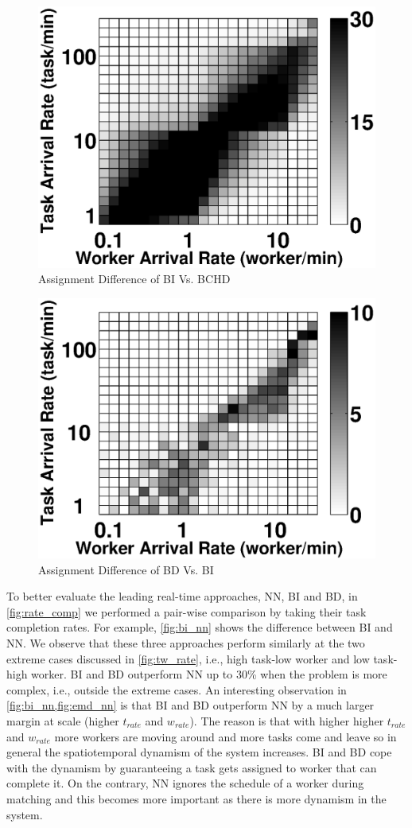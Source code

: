 \begin{figure}[h]
	\centering
	\includegraphics[width = 0.65\columnwidth]{figures/bi_bchd.eps}
	\vspace{-0.1in}
	\caption{Assignment Difference of BI Vs. BCHD}\label{fig:bi_bchd}
\end{figure}

\begin{figure}[h]
	\centering
	\includegraphics[width = 0.65\columnwidth]{figures/emd_bi.eps}
	\vspace{-0.1in}
	\caption{Assignment Difference of BD Vs. BI}\label{fig:emd_bi}
\end{figure}

To better evaluate the leading real-time approaches, NN, BI and BD, in \cref{fig:rate_comp} we performed a pair-wise comparison by taking their task completion rates. For example, \cref{fig:bi_nn} shows the difference between BI and NN. We observe that these three approaches perform similarly at the two extreme cases discussed in \cref{fig:tw_rate}, i.e., high task-low worker and low task-high worker. BI and BD outperform NN up to 30\% when the problem is more complex, i.e., outside the extreme cases. An interesting observation in \cref{fig:bi_nn,fig:emd_nn} is that BI and BD outperform NN by a much larger margin at scale (higher $t_{rate}$ and $w_{rate}$). The reason is that with higher higher $t_{rate}$ and $w_{rate}$ more workers are moving around and more tasks come and leave so in general the spatiotemporal dynamism of the system increases. BI and BD cope with the dynamism by guaranteeing a task gets assigned to worker that can complete it. On the contrary, NN ignores the schedule of a worker during matching and this becomes more important as there is more dynamism in the system.

